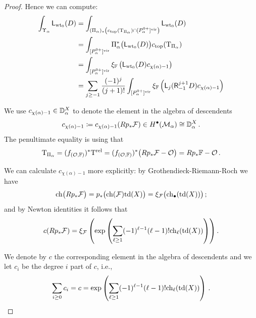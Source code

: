 \documentclass[a4paper, 12pt]{amsart}
\begin{document}
\begin{proof}
Hence we can compute:
\begin{align}
\nonumber \int_{\Upsilon_\alpha}\mathsf{L}_{{\mathrm{wt}_0}}(D)&=\int_{(\Pi_\alpha)_\ast\left(c_{\mathrm{top}}(\mathrm{T}_{\Pi_\alpha})\cap [P_\alpha^{0+}]^{\mathrm{vir}}\right)}\mathsf{L}_{{\mathrm{wt}_0}}(D)\\
\nonumber &
=\int_{[P_\alpha^{0+}]^{\mathrm{vir}}}\Pi^\ast_\alpha \big(\mathsf{L}_{{\mathrm{wt}_0}}(D)\big)c_{\mathrm{top}}(\mathrm{T}_{\Pi_\alpha})\\
 &=\int_{[P_\alpha^{0+}]^{\mathrm{vir}}}\xi_{\mathbb{F}} \left(\mathsf{L}_{{\mathrm{wt}_0}}(D)c_{\chi(\alpha)-1}\right)\nonumber\\
 &=\sum_{j\geq -1}\frac{(-1)^j}{(j+1)!}\int_{[P_\alpha^{0+}]^{\mathrm{vir}}}\xi_{\mathbb{F}} \left({\mathsf{L}}_j(\mathsf{R}_{-1}^{j+1}D)c_{\chi(\alpha)-1}\right) 
 \label{eq: integralUpsilon}
\end{align}

We use $c_{\chi(\alpha)-1}\in {\mathbb{D}}_\alpha^X$ to denote the element in the algebra of descendents
\[c_{\chi(\alpha)-1}\coloneqq c_{\chi(\alpha)-1}(Rp_\ast {\mathcal F})\in H^\bullet({\mathcal M}_\alpha)\cong {\mathbb{D}}_\alpha^X\,.\]
The penultimate equality is using that 
\[\mathrm{T}_{\Pi_\alpha}=(f_{({\mathcal O},{\mathbb{F}})})^\ast \mathrm{T}^{\rm rel} =(f_{({\mathcal O},{\mathbb{F}})})^\ast\big(Rp_\ast {\mathcal F}-{\mathcal O}\big)=Rp_\ast {\mathbb{F}}-{\mathcal O}\,.\]

We can calculate $c_{\chi(\alpha)-1}$ more explicitly: by Grothendieck-Riemann-Roch we have
\[\mathrm{ch}\big(Rp_\ast {\mathcal F}\big)=p_\ast\big(\mathrm{ch}({\mathcal F})\mathrm{td}(X)\big)=\xi_{\mathcal F}\big(\mathrm{ch}_\bullet(\mathrm{td}(X))\big)\,;\]
and by Newton identities it follows that
\[c(Rp_\ast {\mathcal F})=\xi_{\mathcal F}\left(\exp\left(\sum_{\ell\geq 1}(-1)^{\ell-1}(\ell-1)!\mathrm{ch}_\ell(\mathrm{td}(X))\right)\right).\]

We denote by $c$ the corresponding element in the algebra of descendents and we let $c_i$ be the degree $i$ part of $c$, i.e.,
\[\sum_{i\geq 0}c_i=c=\exp\left(\sum_{\ell\geq 1}(-1)^{\ell-1}(\ell-1)!\mathrm{ch}_\ell(\mathrm{td}(X))\right)\,.\]


\end{proof}
\end{document}
